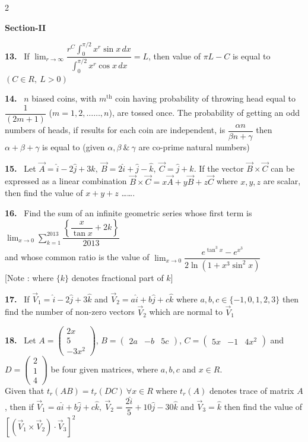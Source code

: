 \documentclass[10pt]{extarticle}
\newcommand{\sect}[1]{\par\smallskip\noindent\textbf{#1}\par}
\newcommand{\qn}[1]{\par\smallskip\noindent\textbf{#1.}~}
\begin{document}
\begin{multicols}{2}
\sect{Section-II}
\qn{13} If $\displaystyle\lim_{r\to\infty}\dfrac{r^C\displaystyle\int_0^{\pi/2}x^r\sin x\,dx}{\displaystyle\int_0^{\pi/2}x^r\cos x\,dx}=L$, then value of $\pi L-C$ is equal to \dotfill $(C\in R,\ L>0)$
\qn{14} $n$ biased coins, with $m^{\text{th}}$ coin having probability of throwing head equal to $\dfrac{1}{(2m+1)}$ ($m=1,2,\dots\dots,n$), are tossed once. The probability of getting an odd numbers of heads, if results for each coin are independent, is $\dfrac{\alpha n}{\beta n+\gamma}$ then $\alpha+\beta+\gamma$ is equal to (given $\alpha,\beta\ \&\ \gamma$ are co-prime natural numbers)
\qn{15} Let $\vec A=\hat i-2\hat j+3\hat k,\ \vec B=2\hat i+\hat j-\hat k,\ \vec C=\hat j+\hat k$. If the vector $\vec B\times\vec C$ can be expressed as a linear combination $\vec B\times\vec C=x\vec A+y\vec B+z\vec C$ where $x,y,z$ are scalar, then find the value of $x+y+z$ \dots\dots.
\qn{16} Find the sum of an infinite geometric series whose first term is $\displaystyle\lim_{x\to0}\sum_{k=1}^{2013}\dfrac{\left\{\dfrac{x}{\tan x}+2k\right\}}{2013}$\\
and whose common ratio is the value of $\displaystyle\lim_{x\to0}\dfrac{e^{\tan^3x}-e^{x^3}}{2\ln\left(1+x^3\sin^2x\right)}$\\
{[}Note : where $\{k\}$ denotes fractional part of $k$]
\qn{17} If $\vec V_1=\hat i-2\hat j+3\hat k$ and $\vec V_2=a\hat i+b\hat j+c\hat k$ where $a,b,c\in\{-1,0,1,2,3\}$ then find the number of non-zero vectors $\vec V_2$ which are normal to $\vec V_1$
\qn{18} Let $A=\begin{pmatrix}2x\\5\\-3x^2\end{pmatrix}$, $B=\begin{pmatrix}2a&-b&5c\end{pmatrix}$, $C=\begin{pmatrix}5x&-1&4x^2\end{pmatrix}$ and $D=\begin{pmatrix}2\\1\\4\end{pmatrix}$ be four given matrices, where $a,b,c$ and $x\in R$.\\
Given that $t_r(AB)=t_r(DC)\ \forall x\in R$ where $t_r(A)$ denotes trace of matrix $A$, then if $\vec V_1=a\hat i+b\hat j+c\hat k,\ \vec V_2=\dfrac{2\hat i}{5}+10\hat j-30\hat k$ and $\vec V_3=\hat k$ then find the value of $\left[\left(\vec V_1\times\vec V_2\right)\cdot\vec V_3\right]^2$\\

\end{multicols}
\end{document}
